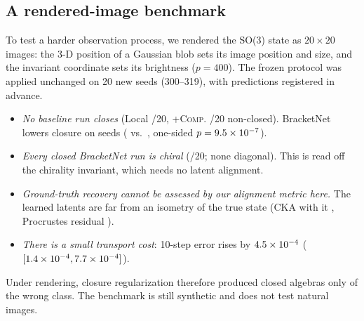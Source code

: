 \subsection{A rendered-image benchmark}\label{sec:render}
To test a harder observation process, we rendered the SO(3) state as $20{\times}20$ images: the 3-D position of a
Gaussian blob sets its image position and size, and the invariant coordinate sets its brightness ($p=400$). The
frozen protocol was applied unchanged on 20 new seeds (300--319), with predictions registered in advance.
\begin{itemize}
\item \emph{No baseline run closes} (Local \REfourLocalNonclosed/20, \textsc{+Comp.} \REfourCompNonclosed/20 non-closed).
BracketNet lowers closure on \REfourClosurebnvscompWins{} seeds (\REfourBracketnetClosure{} vs.\ \REfourCompClosure,
one-sided $p=9.5\times10^{-7}$).
\item \emph{Every closed BracketNet run is chiral} (\REfourBracketnetChiral/20; none diagonal). This is read off the
chirality invariant, which needs no latent alignment.
\item \emph{Ground-truth recovery cannot be assessed by our alignment metric here.} The learned latents are far from
an isometry of the true state (CKA with it \REfourBracketnetCkatruth, Procrustes residual \REfourBracketnetProcrustestruth).
\item \emph{There is a small transport cost}: 10-step error rises by $4.5\times10^{-4}$
($[1.4\times10^{-4},7.7\times10^{-4}]$).
\end{itemize}
Under rendering, closure regularization therefore produced closed algebras only of the wrong class. The benchmark is
still synthetic and does not test natural images.
